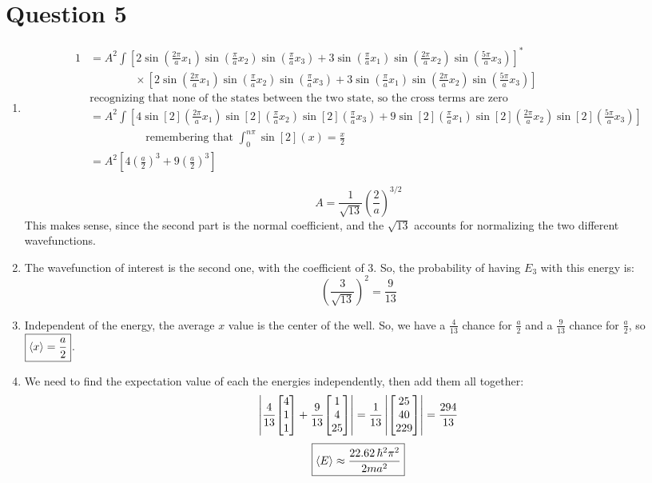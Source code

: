 \documentclass[11pt]{article}
\begin{document}
\section*{Question 5}
\begin{enumerate}[label=\alph*)]
\item 
\begin{align*}
1 & = A^2 \int\left[2\sin(\frac{2\pi}{a}x_1)\sin(\frac{\pi}{a}x_2)\sin(\frac{\pi}{a}x_3) + 3\sin(\frac{\pi}{a}x_1)\sin(\frac{2\pi}{a}x_2)\sin(\frac{5\pi}{a}x_3)\right]^*\\
& \hspace{4em}\times \left[2\sin(\frac{2\pi}{a}x_1)\sin(\frac{\pi}{a}x_2)\sin(\frac{\pi}{a}x_3) + 3\sin(\frac{\pi}{a}x_1)\sin(\frac{2\pi}{a}x_2)\sin(\frac{5\pi}{a}x_3)\right]\\
& \text{recognizing that none of the states between the two state, so the cross terms are zero}\\
& = A^2 \int \left[4\sin[2](\frac{2\pi}{a}x_1)\sin[2](\frac{\pi}{a}x_2)\sin[2](\frac{\pi}{a}x_3) + 9\sin[2](\frac{\pi}{a}x_1)\sin[2](\frac{2\pi}{a}x_2)\sin[2](\frac{5\pi}{a}x_3)\right]\\
& \hspace{5em}\text{remembering that } \int_0^{n\pi} \sin[2](x) = \frac{x}{2}\\
& = A^2 \left[4\left(\frac{a}{2}\right)^3 + 9\left(\frac{a}{2}\right)^3\right]
\end{align*}

\[\boxed{A = \frac{1}{\sqrt{13}}\left(\frac{2}{a}\right)^{3/2}}\]
This makes sense, since the second part is the normal coefficient, and the $\sqrt{13}$ accounts for normalizing the two different wavefunctions. 

\item The wavefunction of interest is the second one, with the coefficient of 3. So, the probability of having $E_3$ with this energy is:
\[\boxed{\left(\frac{3}{\sqrt{13}}\right)^2 = \frac{9}{13}}\]
\item Independent of the energy, the average $x$ value is the center of the well. So, we have a $\displaystyle{\frac{4}{13}}$ chance for $\displaystyle{\frac{a}{2}}$ and a $\displaystyle{\frac{9}{13}}$ chance for $\displaystyle{\frac{a}{2}}$, so $\displaystyle{\boxed{\ev{x} = \frac{a}{2}}}$.
\item We need to find the expectation value of each the energies independently, then add them all together:
\[\left|\frac{4}{13}\mqty[4 \\ 1 \\ 1] + \frac{9}{13}\mqty[1 \\ 4 \\ 25]\right| = \frac{1}{13}\left|\mqty[25\\40\\229]\right| = \frac{294}{13}\]
\[\boxed{\ev{E} \approx \frac{22.62 \, \hbar^2 \pi^2}{2ma^2}}\]
\end{enumerate}
\end{document}
